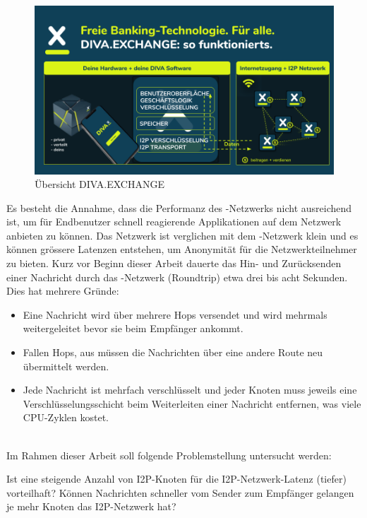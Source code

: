 \begin{figure}[thp!]
    \includegraphics[width=1.0\textwidth]{img/divax-overview.png}
    \caption{Übersicht DIVA.EXCHANGE}\label{fig:divax_overview}
\end{figure}

Es besteht die Annahme, dass die Performanz des -Netzwerks nicht ausreichend ist, um für Endbenutzer schnell reagierende Applikationen auf dem Netzwerk anbieten zu können.
Das Netzwerk ist verglichen mit dem -Netzwerk klein und es können grössere Latenzen entstehen, um Anonymität für die Netzwerkteilnehmer zu bieten.
Kurz vor Beginn dieser Arbeit dauerte das Hin- und Zurücksenden einer Nachricht durch das -Netzwerk (Roundtrip) etwa drei bis acht Sekunden. Dies hat mehrere Gründe:

\begin{itemize}
    \item Eine Nachricht wird über mehrere Hops versendet und wird mehrmals weitergeleitet bevor sie beim Empfänger ankommt.
    \item Fallen Hops, aus müssen die Nachrichten über eine andere Route neu übermittelt werden.
    \item Jede Nachricht ist mehrfach verschlüsselt und jeder Knoten muss jeweils eine Verschlüsselungsschicht beim Weiterleiten einer Nachricht entfernen, was viele CPU-Zyklen kostet.
\end{itemize}
\\
Im Rahmen dieser Arbeit soll folgende Problemstellung untersucht werden:

\begin{hyp} \label{hyp:first}
    Ist eine steigende Anzahl von I2P-Knoten für die I2P-Netzwerk-Latenz (tiefer) vorteilhaft?
    Können Nachrichten schneller vom Sender zum Empfänger gelangen je mehr Knoten das I2P-Netzwerk hat?
\end{hyp}

